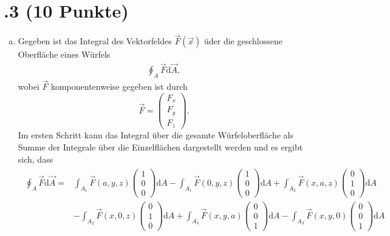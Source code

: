 \section*{\nr.3 \titthree (10 Punkte)}
\begin{enumerate}[(a)]
\item  Gegeben ist das Integral des Vektorfeldes $\vec{F}(\vec{x})$ üder die geschlossene Oberfläche eines Würfels
\begin{align}
\oint_A \vec{F}\mathrm{d}\vec{A},
\end{align}
wobei $\vec{F}$ komponentenweise gegeben ist durch
\begin{equation*}
	\vec{F} = \begin{pmatrix}F_x \\ F_y \\ F_z \end{pmatrix}.
\end{equation*}
Im ersten Schritt kann das Integral über die gesamte Würfeloberfläche als Summe der Integrale über die Einzelflächen dargestellt werden und es ergibt sich, dass 
\begin{align}
\begin{split}
\oint_A \vec{F}\mathrm{d}\vec{A}  = &\int_{A_{1}} \vec{F}(a,y,z)\begin{pmatrix}1 \\ 0 \\ 0 \end{pmatrix} \mathrm{d}A - \int_{A_{1}} \vec{F}(0,y,z)\begin{pmatrix}1 \\ 0 \\ 0 \end{pmatrix}\mathrm{d}A + \int_{A_{2}} \vec{F}(x,a,z)\begin{pmatrix}0 \\ 1 \\ 0 \end{pmatrix}\mathrm{d}A \\ 
& - \int_{A_{2}} \vec{F}(x,0,z)\begin{pmatrix}0 \\ 1 \\ 0 \end{pmatrix}\mathrm{d}A + \int_{A_{3}} \vec{F}(x,y,a)\begin{pmatrix}0 \\ 0 \\ 1 \end{pmatrix}\mathrm{d}A - \int_{A_{3}} \vec{F}(x,y,0)\begin{pmatrix} 0 \\ 0 \\ 1 \end{pmatrix}\mathrm{d}A \\

\end{split}
\end{align}
\end{enumerate}
